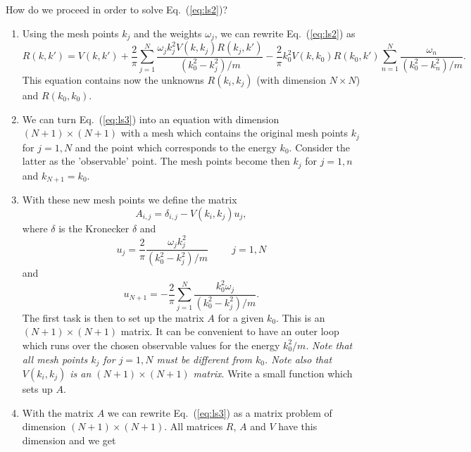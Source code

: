 \documentclass[prc]{revtex4}
\begin{document}
How do we proceed in order to solve Eq.\ (\ref{eq:ls2})?
\begin{enumerate}
  \item  Using the mesh points $k_j$ and the weights $\omega_j$,
         we can rewrite Eq.\ (\ref{eq:ls2}) as
\begin{equation}
          R(k,k') = V(k,k') +\frac{2}{\pi}
          \sum_{j=1}^N\frac{\omega_jk_j^2V(k,k_j)R(k_j,k')}
                           {(k_0^2-k_j^2)/m}
           -\frac{2}{\pi}k_0^2V(k,k_0)R(k_0,k')
          \sum_{n=1}^N\frac{\omega_n}
                           {(k_0^2-k_n^2)/m}.                
          \label{eq:ls3}
\end{equation}
This equation contains now the unknowns $R(k_i,k_j)$
(with dimension $N\times N$) and $R(k_0,k_0)$.
\item 
We can turn Eq.\ (\ref{eq:ls3}) into an equation
with dimension $(N+1)\times (N+1)$ with  a mesh
which contains the original mesh points $k_j$ for $j=1,N$
and the point which corresponds to the energy $k_0$.
Consider the latter as the 'observable' point.
The mesh points become then $k_j$ for $j=1,n$ and
$k_{N+1}=k_0$. 
\item With these new mesh points we define the matrix
\begin{equation}
      A_{i,j}=\delta_{i,j}-V(k_i,k_j)u_j,
      \label{eq:aeq}
\end{equation}
where $\delta$ is the Kronecker $\delta$
and
\begin{equation}
     u_j=\frac{2}{\pi}
         \frac{\omega_jk_j^2}{(k_0^2-k_j^2)/m}\hspace{1cm}
         j=1,N
\end{equation}
and
\begin{equation}
     u_{N+1}=-\frac{2}{\pi}
          \sum_{j=1}^N\frac{k_0^2\omega_j}{(k_0^2-k_j^2)/m}.
\end{equation}
The first task is then to 
set up the matrix $A$ for a given $k_0$. This is an
$(N+1)\times (N+1)$ matrix. It can be convenient
to have an outer loop which runs over the chosen
observable values for the energy $k_0^2/m$.
{\em Note that all mesh points $k_j$ for $j=1,N$ must be
different from $k_0$. Note also that
$V(k_i,k_j)$ is an
$(N+1)\times (N+1)$ matrix}. Write a small function
which sets up $A$.
\item
  With the matrix $A$ we can rewrite Eq.\ (\ref{eq:ls3}) 
  as a matrix problem of dimension $(N+1)\times (N+1)$.
  All matrices $R$, $A$ and $V$ have this dimension
  and we get
\begin{equation}

\end{equation}
\end{enumerate}
\end{document}

